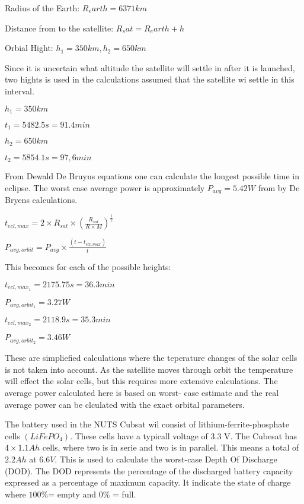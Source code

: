 Radius of the Earth: $R_earth = 6371 km$

Distance from to the satellite: $R_sat = R_earth + h$

Orbial Hight: $h_1 = 350km, h_2=650km $

\vspace{5 mm}Since it is uncertain what altitude the satellite will settle in after it is launched, two hights is used in the calculations assumed that the satellite wi settle in this interval.

\vspace{5 mm}$h_1 = 350km$

$t_1 = 5482.5 s = 91.4 min$

\vspace{5 mm}$h_2 = 650km$

$t_2 = 5854.1 s = 97,6 min$

\vspace{5 mm}From Dewald De Bruyns equations one can calculate the longest possible time in eclipse. The worst case average power is approximately $P_{avg} = 5.42 W$ from by De Bryens calculations.  

\vspace{5 mm}$t_{ecl,max} = 2\times R_{sat}\times(\frac{R_{sat}}{R\times M})^{\frac{1}{2}}$

$P_{avg,orbit} = P_{avg}\times\frac{(t-t_{ecl,max})}{t}$

\vspace{5 mm}This becomes for each of the possible heights:

\vspace{5 mm}$t_{ecl,max_1} = 2175.75 s = 36.3 min$

$P_{avg,orbit_1} = 3.27W$

\vspace{5 mm}$t_{ecl,max_2} = 2118.9 s = 35.3 min$

$P_{avg,orbit_2} = 3.46W$

\vspace{5 mm}These are simpliefied calculations where the teperature changes of the solar cells is not taken into account. As the satellite moves through orbit the temperature will effect the solar cells, but this requires more extensive calculations. The average power calculated here is based on worst- case estimate and the real average power can be clculated with the exact orbital parameters. 

The battery used in the NUTS Cubsat wil consist of lithium-ferrite-phosphate cells $(LiFePO_4)$. 
These cells have a typicall voltage of 3.3 V. The Cubesat has $4\times 1.1 Ah$ cells, where two is in serie and two is in parallel. This means a total of $2.2Ah$ at $6.6V$. This is used to calculate the worst-case Depth Of Discharge (DOD). The DOD represents the percentage of the discharged battery capacity expressed as a percentage of maximum capacity. It indicate the state of charge where $100\% $= empty and  $0\%$ = full.

